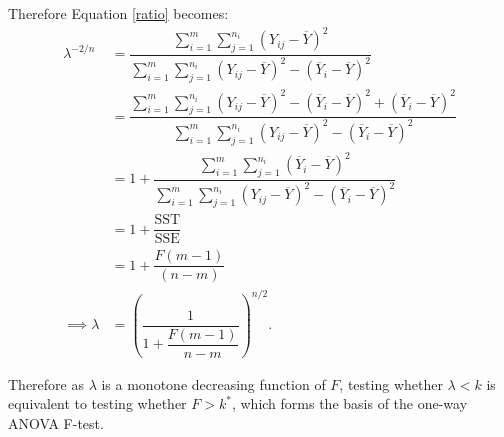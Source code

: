 \documentclass[12pt,a4paper,openright]{article}
\newcommand{\eqn}[1]{Equation \ref{#1}}
\newcommand{\ovY}{\overline{Y}}
\newcommand{\SST}{\mathrm{SST}}
\newcommand{\SSE}{\mathrm{SSE}}
\begin{document}
	Therefore \eqn{ratio} becomes:
	\begin{align*}
		\lambda^{-2/n} &= \dfrac{\sum_{i=1}^m \sum_{j=1}^{n_i} (Y_{ij}-\ovY)^2}{\sum_{i=1}^m \sum_{j=1}^{n_i} (Y_{ij}-\ovY)^2 - (\ovY_i-\ovY)^2} \\
		&= \dfrac{\sum_{i=1}^m \sum_{j=1}^{n_i} (Y_{ij}-\ovY)^2 - (\ovY_i-\ovY)^2 + (\ovY_i-\ovY)^2}{\sum_{i=1}^m \sum_{j=1}^{n_i} (Y_{ij}-\ovY)^2 - (\ovY_i-\ovY)^2} \\
		&= 1 + \dfrac{\sum_{i=1}^m \sum_{j=1}^{n_i} (\ovY_i-\ovY)^2}{\sum_{i=1}^m \sum_{j=1}^{n_i} (Y_{ij}-\ovY)^2 - (\ovY_i-\ovY)^2} \\
		&= 1 + \dfrac{\SST}{\SSE} \\
		&= 1 + \dfrac{F(m-1)}{(n-m)} \\
		\implies \lambda &= \left(\dfrac{1}{1+\dfrac{F(m-1)}{n-m}}\right)^{n/2}.
	\end{align*}

	Therefore as $\lambda$ is a monotone decreasing function of $F$, testing whether $\lambda < k$ is equivalent to testing whether $F > k^{*}$, which forms the basis of the one-way ANOVA F-test.  
\end{document}
